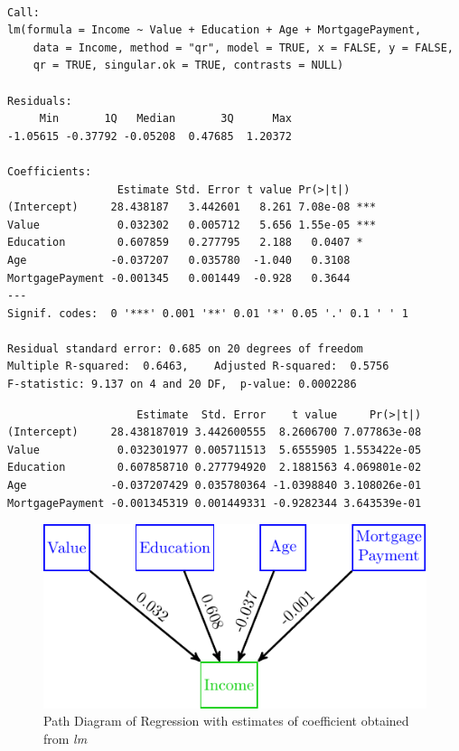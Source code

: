 \begin{verbatim}

Call:
lm(formula = Income ~ Value + Education + Age + MortgagePayment, 
    data = Income, method = "qr", model = TRUE, x = FALSE, y = FALSE, 
    qr = TRUE, singular.ok = TRUE, contrasts = NULL)

Residuals:
     Min       1Q   Median       3Q      Max 
-1.05615 -0.37792 -0.05208  0.47685  1.20372 

Coefficients:
                 Estimate Std. Error t value Pr(>|t|)    
(Intercept)     28.438187   3.442601   8.261 7.08e-08 ***
Value            0.032302   0.005712   5.656 1.55e-05 ***
Education        0.607859   0.277795   2.188   0.0407 *  
Age             -0.037207   0.035780  -1.040   0.3108    
MortgagePayment -0.001345   0.001449  -0.928   0.3644    
---
Signif. codes:  0 '***' 0.001 '**' 0.01 '*' 0.05 '.' 0.1 ' ' 1

Residual standard error: 0.685 on 20 degrees of freedom
Multiple R-squared:  0.6463,    Adjusted R-squared:  0.5756 
F-statistic: 9.137 on 4 and 20 DF,  p-value: 0.0002286
\end{verbatim}

\begin{Shaded}
\begin{Highlighting}[]
\OperatorTok{$}
\end{Highlighting}
\end{Shaded}

\begin{verbatim}
                    Estimate  Std. Error    t value     Pr(>|t|)
(Intercept)     28.438187019 3.442600555  8.2606700 7.077863e-08
Value            0.032301977 0.005711513  5.6555905 1.553422e-05
Education        0.607858710 0.277794920  2.1881563 4.069801e-02
Age             -0.037207429 0.035780364 -1.0398840 3.108026e-01
MortgagePayment -0.001345319 0.001449331 -0.9282344 3.643539e-01
\end{verbatim}

\begin{figure}[H]

{\centering \includegraphics[width=0.8\linewidth]{images/Reg1Values} 

}

\caption{Path Diagram of Regression with estimates of coefficient obtained from \emph{lm}}\label{fig:Reg1Values}
\end{figure}

